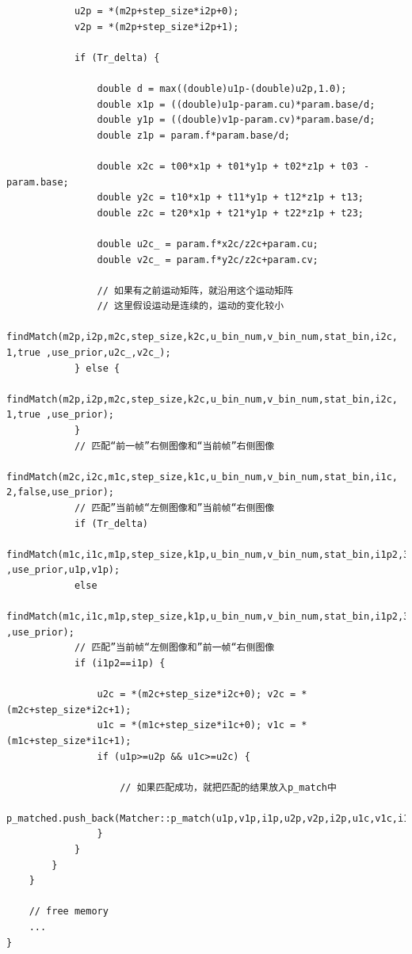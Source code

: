 \documentclass[UTF8]{ctexart}
\begin{document}
\begin{verbatim}
            u2p = *(m2p+step_size*i2p+0);
            v2p = *(m2p+step_size*i2p+1);

            if (Tr_delta) {
            
                double d = max((double)u1p-(double)u2p,1.0);
                double x1p = ((double)u1p-param.cu)*param.base/d;
                double y1p = ((double)v1p-param.cv)*param.base/d;
                double z1p = param.f*param.base/d;

                double x2c = t00*x1p + t01*y1p + t02*z1p + t03 - param.base;
                double y2c = t10*x1p + t11*y1p + t12*z1p + t13;
                double z2c = t20*x1p + t21*y1p + t22*z1p + t23;

                double u2c_ = param.f*x2c/z2c+param.cu;
                double v2c_ = param.f*y2c/z2c+param.cv;

                // 如果有之前运动矩阵，就沿用这个运动矩阵
                // 这里假设运动是连续的，运动的变化较小
                findMatch(m2p,i2p,m2c,step_size,k2c,u_bin_num,v_bin_num,stat_bin,i2c, 1,true ,use_prior,u2c_,v2c_);
            } else {
                findMatch(m2p,i2p,m2c,step_size,k2c,u_bin_num,v_bin_num,stat_bin,i2c, 1,true ,use_prior);
            }
            // 匹配“前一帧”右侧图像和“当前帧”右侧图像
            findMatch(m2c,i2c,m1c,step_size,k1c,u_bin_num,v_bin_num,stat_bin,i1c, 2,false,use_prior);
            // 匹配”当前帧“左侧图像和”当前帧“右侧图像
            if (Tr_delta)
                findMatch(m1c,i1c,m1p,step_size,k1p,u_bin_num,v_bin_num,stat_bin,i1p2,3,true ,use_prior,u1p,v1p);
            else
                findMatch(m1c,i1c,m1p,step_size,k1p,u_bin_num,v_bin_num,stat_bin,i1p2,3,true ,use_prior);
            // 匹配”当前帧“左侧图像和”前一帧“右侧图像
            if (i1p2==i1p) {

                u2c = *(m2c+step_size*i2c+0); v2c = *(m2c+step_size*i2c+1);
                u1c = *(m1c+step_size*i1c+0); v1c = *(m1c+step_size*i1c+1);
                if (u1p>=u2p && u1c>=u2c) {
                
                    // 如果匹配成功，就把匹配的结果放入p_match中
                    p_matched.push_back(Matcher::p_match(u1p,v1p,i1p,u2p,v2p,i2p,u1c,v1c,i1c,u2c,v2c,i2c));
                }
            }
        }
    }

    // free memory
    ...
}
    \end{verbatim}
\end{document}
